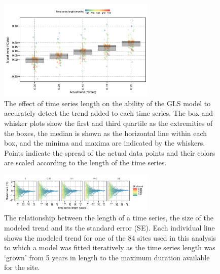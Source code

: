 \documentclass[]{ametsoc}
\begin{document}
\begin{figure}
\centering \includegraphics[width=7.5cm]{figure02}
\caption[\small The effect of time series length on the ability of the GLS model to accurately detect the trend added to a time series]{The effect of time series length on the ability of the GLS model to accurately detect the trend added to each time series. The box-and-whisker plots show the first and third quartile as the extremities of the boxes, the median is shown as the horizontal line within each box, and the minima and maxima are indicated by the whiskers. Points indicate the spread of the actual data points and their colors are scaled according to the length of the time series.}
\label{figure02}
\end{figure}

\begin{figure}
\centering \includegraphics[width=7.5cm]{figure03}
\caption[\small The relationship between time series length and the standard error (SE) of the modelled trend]{The relationship between the length of a time series, the size of the modeled trend and its the standard error (SE). Each individual line shows the modeled trend for one of the 84 sites used in this analysis to which a model was fitted iteratively as the time series length was `grown' from 5 years in length to the maximum duration available for the site.}
\label{figure03}
\end{figure}
\end{document}
